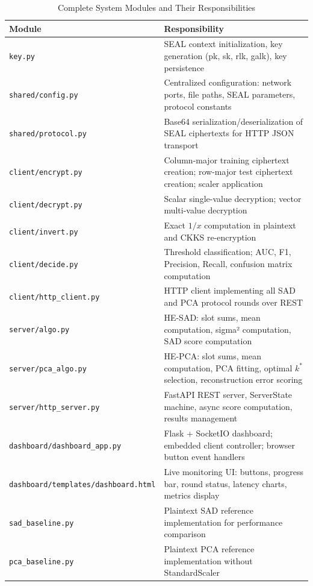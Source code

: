 \begin{table}[!ht]
\centering
\caption{Complete System Modules and Their Responsibilities}
\label{tab:modules}
\begin{tabular}{p{5cm}p{8cm}}
\toprule
\textbf{Module} & \textbf{Responsibility} \\
\midrule
\texttt{key.py} & SEAL context initialization, key generation (pk, sk, rlk, galk), key persistence \\
\texttt{shared/config.py} & Centralized configuration: network ports, file paths, SEAL parameters, protocol constants \\
\texttt{shared/protocol.py} & Base64 serialization/deserialization of SEAL ciphertexts for HTTP JSON transport \\
\texttt{client/encrypt.py} & Column-major training ciphertext creation; row-major test ciphertext creation; scaler application \\
\texttt{client/decrypt.py} & Scalar single-value decryption; vector multi-value decryption \\
\texttt{client/invert.py} & Exact $1/x$ computation in plaintext and CKKS re-encryption \\
\texttt{client/decide.py} & Threshold classification; AUC, F1, Precision, Recall, confusion matrix computation \\
\texttt{client/http\_client.py} & HTTP client implementing all SAD and PCA protocol rounds over REST \\
\texttt{server/algo.py} & HE-SAD: slot sums, mean computation, sigma² computation, SAD score computation \\
\texttt{server/pca\_algo.py} & HE-PCA: slot sums, mean computation, PCA fitting, optimal $k^*$ selection, reconstruction error scoring \\
\texttt{server/http\_server.py} & FastAPI REST server, ServerState machine, async score computation, results management \\
\texttt{dashboard/dashboard\_app.py} & Flask + SocketIO dashboard; embedded client controller; browser button event handlers \\
\texttt{dashboard/templates/dashboard.html} & Live monitoring UI: buttons, progress bar, round status, latency charts, metrics display \\
\texttt{sad\_baseline.py} & Plaintext SAD reference implementation for performance comparison \\
\texttt{pca\_baseline.py} & Plaintext PCA reference implementation without StandardScaler \\
\bottomrule
\end{tabular}
\end{table}

